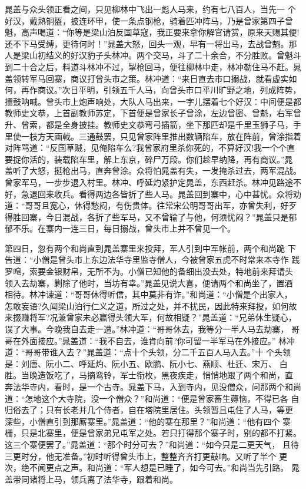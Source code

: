 晁盖与众头领正看之间，只见柳林中飞出一彪人马来，约有七八百人，当先一
个好汉，戴熟铜盔，披连环甲，使一条点钢枪，骑着匹冲阵马，乃是曾家第四子曾
魁，高声喝道：“你等是梁山泊反国草寇，我正要来拿你解官请赏，原来天赐其便!
还不下马受缚，更待何时！”晁盖大怒，回头一观，早有一将出马，去战曾魁。那
人是梁山初结义的好汉豹子头林冲。两个交马，斗了二十余合，不分胜败。曾魁斗
到二十合之后，料道斗林冲不过，掣枪回马，便往柳林中走，林冲勒住马不赶。晁
盖领转军马回寨，商议打曾头市之策。林冲道：“来日直去市口搦战，就看虚实如
何，再作商议。”次日平明，引领五千人马，向曾头市口平川旷野之地，列成阵势，
擂鼓呐喊。曾头市上炮声响处，大队人马出来，一字儿摆着七个好汉：中间便是都
教师史文恭，上首副教师苏定，下首便是曾家长子曾涂，左边曾密、曾魁，右军曾
升、曾索，都是全身披挂。教师史文恭弯弓插箭，坐下那匹却是千里玉狮子马，手
里使一枝方天画戟。三通鼓罢，只见曾家阵里推出数辆陷车，放在阵前，曾涂指着
对阵骂道：“反国草贼，见俺陷车么?我曾家府里杀你死的，不算好汉!我一个个直
要捉你活的，装载陷车里，解上东京，碎尸万段。你们趁早纳降，再有商议。”晁
盖听了大怒，挺枪出马，直奔曾涂。众将怕晁盖有失，一发掩杀过去，两军混战。
曾家军马，一步步退入村里。林冲、呼延灼紧护定晁盖，东西赶杀。林冲见路途不
好，急退回来收兵。看得两边各皆折了些人马。晁盖回到寨中，心中甚忧。众将劝
道：“哥哥且宽心，休得愁闷，有伤贵体。往常宋公明哥哥出军，亦曾失利，好歹
得胜回寨，今日混战，各折了些军马，又不曾输了与他，何须忧闷？”晁盖只是郁
郁不乐。在寨内一连三日，每日搦战，曾头市上并不曾见一个。

第四日，忽有两个和尚直到晁盖寨里来投拜，军人引到中军帐前，两个和尚跪
下告道：“小僧是曾头市上东边法华寺里监寺僧人，今被曾家五虎不时常来本寺作
践罗唣，索要金银财帛，无所不为。小僧已知他的备细出没去处，特地前来拜请头
领入去劫寨，剿除了他时，当坊有幸。”晁盖见说大喜，便请两个和尚坐了，置酒
相待。林冲谏道：“哥哥休得听信，其中莫非有诈。”和尚道：“小僧是个出家人，
怎敢妄语?久闻梁山泊行仁义之道，所过之处，并不扰民，因此特来拜投，如何故
来掇赚将军?况兼曾家未必赢得头领大军，何故相疑？”晁盖道：“兄弟休生疑心，
误了大事。今晚我自去走一遭。”林冲道：“哥哥休去，我等分一半人马去劫寨，
哥哥在外面接应。”晁盖道：“我不自去，谁肯向前?你可留一半军马在外接应。”
林冲道：“哥哥带谁入去？”晁盖道：“点十个头领，分二千五百人马入去。”十
个头领是：刘唐、阮小二、呼延灼、阮小五、欧鹏、阮小七、燕顺、杜迁、宋万、
白胜。当晚造饭吃了，马摘鸾铃，军士衔枚，黑夜疾走，悄悄地跟了两个和尚，直
奔法华寺内，看时，是一个古寺。晁盖下马，入到寺内，见没僧众，问那两个和尚
道：“怎地这个大寺院，没一个僧众？”和尚道：“便是曾家畜生薅恼，不得已各
自归俗去了；只有长老并几个侍者，自在塔院里居住。头领暂且屯住了人马，等更
深些，小僧直引到那厮寨里。”晁盖道：“他的寨在那里？”和尚道：“他有四个
寨栅，只是北寨里，便是曾家弟兄屯军之处。若只打得那个寨子时，别的都不打紧。
这三个寨便罢了。”晁盖道：“那个时分可去？”和尚道：“如今只是二更天气，
且待三更时分，他无准备。”初时听得曾头市上，整整齐齐打更鼓响。又听了半个
更次，绝不闻更点之声。和尚道：“军人想是已睡了，如今可去。”和尚当先引路。
晁盖带同诸将上马，领兵离了法华寺，跟着和尚。

